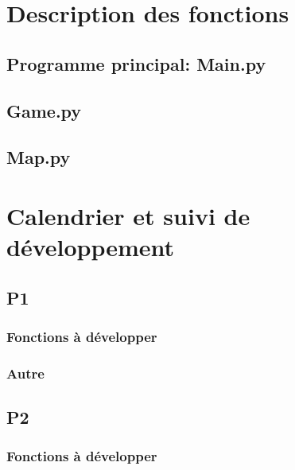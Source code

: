 \documentclass{article}
\begin{document}
    \section{Description des fonctions}
        \subsection{Programme principal: Main.py}
        \subsection{Game.py}
        \subsection{Map.py}
    \section{Calendrier et suivi de développement}
        \subsection{P1}
            \subsubsection{Fonctions à développer}
            \subsubsection{Autre}
        \subsection{P2}
            \subsubsection{Fonctions à développer}
\end{document}
